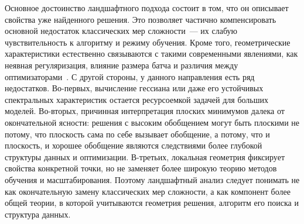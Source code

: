 \documentclass[russian]{intsys}
\begin{document}
Основное достоинство ландшафтного подхода состоит в том, что он описывает свойства уже найденного решения.
Это позволяет частично компенсировать основной недостаток классических мер сложности~--- их слабую чувствительность к алгоритму и режиму обучения.
Кроме того, геометрические характеристики естественно связываются с такими современными явлениями, как неявная регуляризация, влияние размера батча и различия между оптимизаторами~\cite{bousquet2002stability,hardt2016train}.
С другой стороны, у данного направления есть ряд недостатков.
Во-первых, вычисление гессиана или даже его устойчивых спектральных характеристик остается ресурсоемкой задачей для больших моделей.
Во-вторых, причинная интерпретация плоских минимумов далека от окончательной ясности: решения с высоким обобщением могут быть плоскими не потому, что плоскость сама по себе вызывает обобщение, а потому, что и плоскость, и хорошее обобщение являются следствиями более глубокой структуры данных и оптимизации.
В-третьих, локальная геометрия фиксирует свойства конкретной точки, но не заменяет более широкую теорию методов обучения и масштабирования.
Поэтому ландшафтный анализ следует понимать не как окончательную замену классических мер сложности, а как компонент более общей теории, в которой учитываются геометрия решения, алгоритм его поиска и структура данных.
\end{document}
